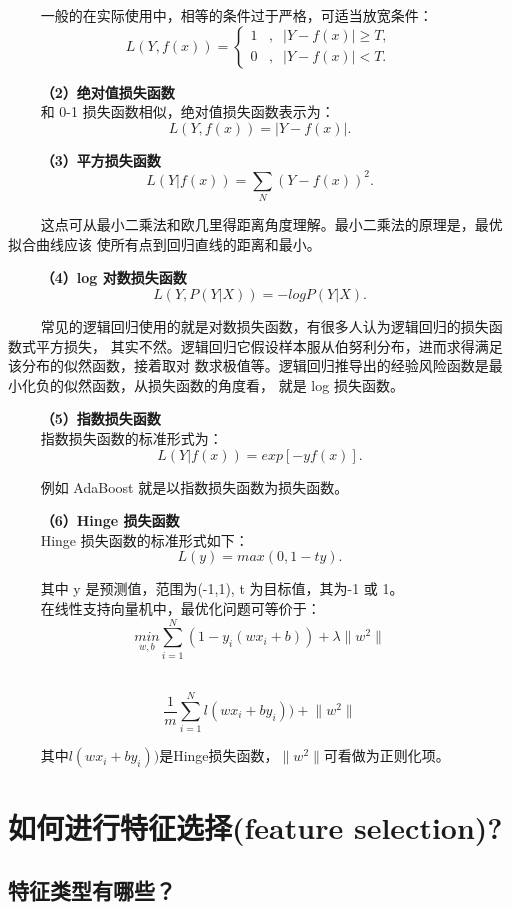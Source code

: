   一般的在实际使用中，相等的条件过于严格，可适当放宽条件： \[
L(Y,f(x))=
\left\{
\begin{array}{}
1\;\;\;,\;\;|Y - f(x)| \ge T, \\
0\;\;\;,\;\;|Y-f(x)| < T.
\end{array}
\right.
\]

   \textbf{（2）绝对值损失函数}\\
   和 0-1 损失函数相似，绝对值损失函数表示为： \[
L(Y,f(x))=|Y-f(x)|.
\]

   \textbf{（3）平方损失函数}\\
\[
L(Y|f(x))=\sum_{N}(Y-f(x))^2.
\]

  
这点可从最小二乘法和欧几里得距离角度理解。最小二乘法的原理是，最优拟合曲线应该
使所有点到回归直线的距离和最小。

   \textbf{（4）log 对数损失函数}\\
\[
L(Y,P(Y|X))=-logP(Y|X).
\]

  
常见的逻辑回归使用的就是对数损失函数，有很多人认为逻辑回归的损失函数式平方损失，
其实不然。逻辑回归它假设样本服从伯努利分布，进而求得满足该分布的似然函数，接着取对
数求极值等。逻辑回归推导出的经验风险函数是最小化负的似然函数，从损失函数的角度看，
就是 log 损失函数。

   \textbf{（5）指数损失函数}\\
   指数损失函数的标准形式为： \[
L(Y|f(x))=exp[-yf(x)].
\]

   例如 AdaBoost 就是以指数损失函数为损失函数。

   \textbf{（6）Hinge 损失函数}\\
   Hinge 损失函数的标准形式如下： \[
L(y)=max(0, 1-ty).
\]

   其中 y 是预测值，范围为(-1,1), t 为目标值，其为-1 或 1。\\
   在线性支持向量机中，最优化问题可等价于： \[
\underset{w,b}{min}\sum_{i=1}^{N}(1-y_i(wx_i+b))+\lambda \lVert w^2 \rVert
\]

   \[
\frac{1}{m}\sum_{i=1}^{N}l(wx_i+by_i))+\lVert w^2 \rVert
\]

  
其中\(l(wx_i+by_i))\)是Hinge损失函数，\(\lVert w^2 \rVert\)可看做为正则化项。

\section{ 如何进行特征选择(feature selection)?}\label{ux5982ux4f55ux8fdbux884cux7279ux5f81ux9009ux62e9feature-selection}

\subsection{特征类型有哪些？}\label{ux7279ux5f81ux7c7bux578bux6709ux54eaux4e9b}

